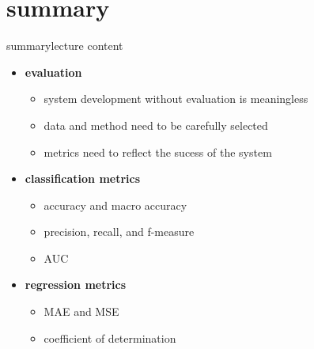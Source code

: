     \section{summary}
        \begin{frame}{summary}{lecture content}
            \begin{itemize}
                \item   \textbf{evaluation}
                    \begin{itemize}
                        \item   system development without evaluation is meaningless
                        \item   data and method need to be carefully selected
                        \item   metrics need to reflect the sucess of the system
                    \end{itemize}
                \bigskip
                \item   \textbf{classification metrics}
                    \begin{itemize}
                        \item   accuracy and macro accuracy
                        \item   precision, recall, and f-measure
                        \item   AUC
                    \end{itemize}
                \bigskip
                \item   \textbf{regression metrics}
                    \begin{itemize}
                        \item   MAE and MSE
                        \item   coefficient of determination
                    \end{itemize}
            \end{itemize}
        \end{frame}

